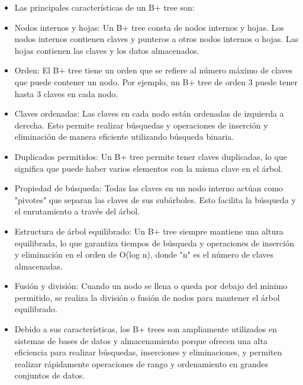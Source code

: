 \documentclass{article}
\begin{document}
		

	\begin{itemize}
		\item Las principales características de un B+ tree son:

\item Nodos internos y hojas: Un B+ tree consta de nodos internos y hojas. Los nodos internos contienen claves y punteros a otros nodos internos o hojas. Las hojas contienen las claves y los datos almacenados.

\item Orden: El B+ tree tiene un orden que se refiere al número máximo de claves que puede contener un nodo. Por ejemplo, un B+ tree de orden 3 puede tener hasta 3 claves en cada nodo.

\item Claves ordenadas: Las claves en cada nodo están ordenadas de izquierda a derecha. Esto permite realizar búsquedas y operaciones de inserción y eliminación de manera eficiente utilizando búsqueda binaria.

\item Duplicados permitidos: Un B+ tree permite tener claves duplicadas, lo que significa que puede haber varios elementos con la misma clave en el árbol.

\item Propiedad de búsqueda: Todas las claves en un nodo interno actúan como "pivotes" que separan las claves de sus subárboles. Esto facilita la búsqueda y el enrutamiento a través del árbol.

\item Estructura de árbol equilibrado: Un B+ tree siempre mantiene una altura equilibrada, lo que garantiza tiempos de búsqueda y operaciones de inserción y eliminación en el orden de O(log n), donde "n" es el número de claves almacenadas.

\item Fusión y división: Cuando un nodo se llena o queda por debajo del mínimo permitido, se realiza la división o fusión de nodos para mantener el árbol equilibrado.

\item Debido a sus características, los B+ trees son ampliamente utilizados en sistemas de bases de datos y almacenamiento porque ofrecen una alta eficiencia para realizar búsquedas, inserciones y eliminaciones, y permiten realizar rápidamente operaciones de rango y ordenamiento en grandes conjuntos de datos.
	\end{itemize}
\end{document}
